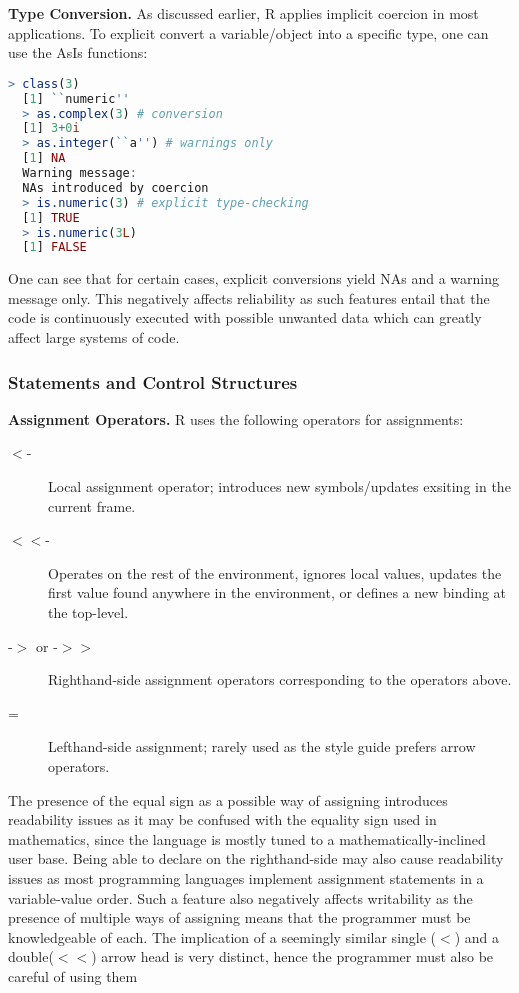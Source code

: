 \documentclass[12pt]{article}
\begin{document}
\textbf{Type Conversion.} As discussed earlier, R applies implicit coercion in most applications. To explicit convert a variable/object into a specific type, one can use the AsIs functions:

\begin{lstlisting}[language=R, frame=none]
  > class(3)
  [1] ``numeric''
  > as.complex(3) # conversion
  [1] 3+0i
  > as.integer(``a'') # warnings only
  [1] NA
  Warning message:
  NAs introduced by coercion
  > is.numeric(3) # explicit type-checking
  [1] TRUE
  > is.numeric(3L)
  [1] FALSE
\end{lstlisting}

One can see that for certain cases, explicit conversions yield NAs and a warning message only. This negatively affects reliability as such features entail that the code is continuously executed with possible unwanted data which can greatly affect large systems of code.

\subsubsection{Statements and Control Structures}

\textbf{Assignment Operators.} R uses the following operators for assignments:

\begin{description}
\item[\(<\)-] Local assignment operator; introduces new symbols/updates exsiting in the current frame.
\item[\(<<\)-] Operates on the rest of the environment, ignores local values, updates the first value found anywhere in the environment, or defines a new binding at the top-level.
\item [-\(>\) or -\(>>\)] Righthand-side assignment operators corresponding to the operators above.
\item[=] Lefthand-side assignment; rarely used as the style guide prefers arrow operators.
\end{description}

The presence of the equal sign as a possible way of assigning introduces readability issues as it may be confused with the equality sign used in mathematics, since the language is mostly tuned to a mathematically-inclined user base. Being able to declare on the righthand-side may also cause readability issues as most programming languages implement assignment statements in a variable-value order. Such a feature also negatively affects writability as the presence of multiple ways of assigning means that the programmer must be knowledgeable of each. The implication of a seemingly similar single (\(<\)) and a double(\(<<\)) arrow head is very distinct, hence the programmer must also be careful of using them
\end{document}
